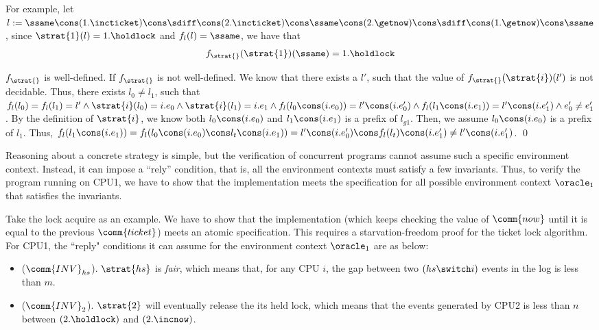 For example,
let $l:=\ssame \cons (1.\incticket) \cons
\sdiff \cons (2.\incticket) \cons
\ssame \cons (2.\getnow) \cons
\sdiff \cons (1.\getnow) \cons
\ssame$,
since $\strat{1} (l) = 1.\holdlock$
and $f_l(l) = \ssame$,
we have that
\[
f_{\strat{}}(\strat{1}) (\ssame) =1.\holdlock
\]

\begin{lemma}
$f_{\strat{}}$ is well-defined.
\proof
If $f_{\strat{}}$ is not well-defined.
We know that there exists a $l'$,
such that the value of $f_{\strat{}}(\strat{i}) (l')$
is not decidable.
Thus, there exists $l_0 \neq l_1$,
such that $f_l(l_0) = f_l(l_1) = l'
\wedge \strat{i}(l_0) = i.e_0
\wedge \strat{i}(l_1) = i.e_1
\wedge f_l(l_0\cons(i.e_0)) = l' \cons (i.e_0')
\wedge f_l(l_1\cons(i.e_1)) = l' \cons (i.e_1')
\wedge e_0' \neq e_1'$.
By the definition of $\strat{i}$,
we know both $l_0\cons(i.e_0)$ and $l_1\cons(i.e_1)$
is a prefix of $l_{g1}$.
Then, we assume $l_0\cons(i.e_0)$ is a prefix 
of $l_1$.
Thus, $f_l(l_1\cons(i.e_1))
= f_l(l_0\cons(i.e_0) \cons l_t \cons(i.e_1))
= l' \cons (i.e_0') \cons f_l(l_t) \cons (i.e_1')
\neq l' \cons (i.e_1')$.
\qed
\end{lemma}

Reasoning about a concrete strategy is simple,
but the verification of concurrent programs  cannot assume 
such a specific environment context.
Instead, it can impose a ``rely'' condition, that is, all the environment contexts
must satisfy a few invariants. 
Thus, to verify the program running on CPU1,
we have to show that
the implementation meets the specification
for all possible environment context $\oracle_1$
that satisfies the invariants.

Take the lock acquire as an example.
We have to show
that the implementation
(which keeps checking 
the value of $\comm{now}$ until 
it is equal to the previous $\comm{ticket}$)
meets an atomic specification.
This requires a starvation-freedom proof
for the ticket lock algorithm.
For CPU1,
the ``reply" conditions it can assume
for the environment context $\oracle_1$
are as below:
\begin{itemize}
\itemsep0em
\item ($\comm{INV}_{hs}$).  $\strat{hs}$ is \emph{fair},
which means that, for any CPU $i$,
the gap between two $(hs \switch i)$ events
in the log
is less than $m$.
\item ($\comm{INV}_{2}$).
$\strat{2}$ will eventually release
the its held lock, which means that
the events generated by CPU2 is
 less than $n$ between $(2.\holdlock)$
and $(2.\incnow)$.
\end{itemize}

